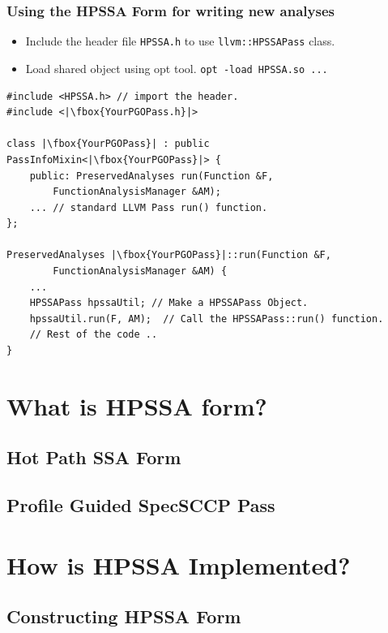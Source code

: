 \documentclass[aspectratio=169, compress]{beamer}
\begin{document}
\begin{frame}[fragile]
	\frametitle{Using the HPSSA Form for writing new analyses}
	\begin{itemize}
		\item Include the header file \texttt{HPSSA.h} to use  \texttt{llvm::HPSSAPass} class.
		\item Load shared object using opt tool. \texttt{opt -load HPSSA.so ...} 
	\end{itemize}
	\begin{verbatim}
#include <HPSSA.h> // import the header.
#include <|\fbox{YourPGOPass.h}|>

class |\fbox{YourPGOPass}| : public PassInfoMixin<|\fbox{YourPGOPass}|> {
	public: PreservedAnalyses run(Function &F, 
		FunctionAnalysisManager &AM);
	... // standard LLVM Pass run() function.
};

PreservedAnalyses |\fbox{YourPGOPass}|::run(Function &F, 
		FunctionAnalysisManager &AM) {
	...
	HPSSAPass hpssaUtil; // Make a HPSSAPass Object.
	hpssaUtil.run(F, AM);  // Call the HPSSAPass::run() function.
	// Rest of the code ..
}
	\end{verbatim}
\end{frame}
\section{What is HPSSA form?}
\subsection{Hot Path SSA Form}
{
	
}
\subsection{Profile Guided SpecSCCP Pass}
{
	
}
\footnotesize

\section{How is HPSSA Implemented?}
\subsection{Constructing HPSSA Form}
{
	
}
{
	
}
\end{document}
